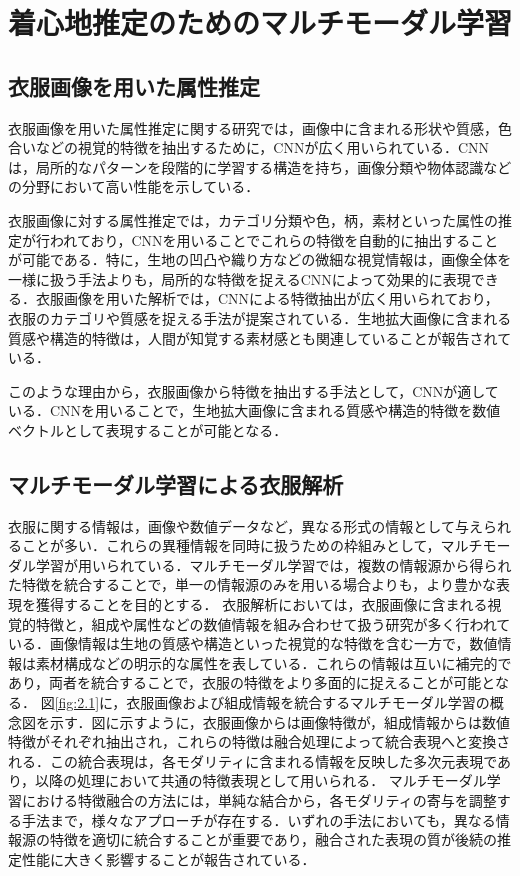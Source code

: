 \documentclass[a4paper,12pt]{jreport}
\begin{document}
\chapter{着心地推定のためのマルチモーダル学習}

\section{衣服画像を用いた属性推定}

衣服画像を用いた属性推定に関する研究では，画像中に含まれる形状や質感，色合いなどの視覚的特徴を抽出するために，CNNが広く用いられている\cite{LeCun}．CNNは，局所的なパターンを段階的に学習する構造を持ち，画像分類や物体認識などの分野において高い性能を示している．

衣服画像に対する属性推定では，カテゴリ分類や色，柄，素材といった属性の推定が行われており，CNNを用いることでこれらの特徴を自動的に抽出することが可能である．特に，生地の凹凸や織り方などの微細な視覚情報は，画像全体を一様に扱う手法よりも，局所的な特徴を捉えるCNNによって効果的に表現できる．衣服画像を用いた解析では，CNNによる特徴抽出が広く用いられており，衣服のカテゴリや質感を捉える手法が提案されている\cite{LiuZ}\cite{Bell}\cite{Cimpoi}．生地拡大画像に含まれる質感や構造的特徴は，人間が知覚する素材感とも関連していることが報告されている\cite{Sharan}．

このような理由から，衣服画像から特徴を抽出する手法として，CNNが適している．CNNを用いることで，生地拡大画像に含まれる質感や構造的特徴を数値ベクトルとして表現することが可能となる．

\section{マルチモーダル学習による衣服解析}
衣服に関する情報は，画像や数値データなど，異なる形式の情報として与えられることが多い．これらの異種情報を同時に扱うための枠組みとして，マルチモーダル学習が用いられている\cite{Ngiam}．マルチモーダル学習では，複数の情報源から得られた特徴を統合することで，単一の情報源のみを用いる場合よりも，より豊かな表現を獲得することを目的とする．
衣服解析においては，衣服画像に含まれる視覚的特徴と，組成や属性などの数値情報を組み合わせて扱う研究が多く行われている\cite{McAuley15}．画像情報は生地の質感や構造といった視覚的な特徴を含む一方で，数値情報は素材構成などの明示的な属性を表している．これらの情報は互いに補完的であり，両者を統合することで，衣服の特徴をより多面的に捉えることが可能となる．
図\ref{fig:2.1}に，衣服画像および組成情報を統合するマルチモーダル学習の概念図を示す．図に示すように，衣服画像からは画像特徴が，組成情報からは数値特徴がそれぞれ抽出され，これらの特徴は融合処理によって統合表現へと変換される．この統合表現は，各モダリティに含まれる情報を反映した多次元表現であり，以降の処理において共通の特徴表現として用いられる．
マルチモーダル学習における特徴融合の方法には，単純な結合から，各モダリティの寄与を調整する手法まで，様々なアプローチが存在する\cite{Baltrušaitis}．いずれの手法においても，異なる情報源の特徴を適切に統合することが重要であり，融合された表現の質が後続の推定性能に大きく影響することが報告されている\cite{Ngiam}\cite{Baltrušaitis}\cite{Srivastava}\cite{Ramachandram}．
\end{document}
